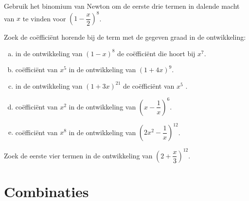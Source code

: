 \documentclass[12pt,twoside]{article}
\begin{document}
\begin{oefening}
Gebruik het binomium van Newton om de eerste drie termen in dalende macht van $x$ te vinden voor $\left(1-\dfrac{x}{2}\right)^8$.
\end{oefening}

\begin{oefening}
Zoek de coëfficiënt horende bij de term met de gegeven graad in de ontwikkeling:
\begin{enumerate}[(a)]
  \item in de ontwikkeling van $\left(1-x\right)^8$ de coëfficiënt die hoort bij $x^7$.
  \item coëfficiënt van $x^5$ in de ontwikkeling van $\left(1+4x\right)^9$.
  \item in de ontwikkeling van $\left(1+3x\right)^{21}$ de coëfficiënt van $x^5$ .
  \item coëfficiënt van $x^2$ in de ontwikkeling van $\left(x-\dfrac{1}{x}\right)^6$.
  \item coëfficiënt van $x^8$ in de ontwikkeling van $\left(2x^2-\dfrac{1}{x}\right)^{12}$.
\end{enumerate}
\end{oefening}

\begin{oefening}
Zoek de eerste vier termen in de ontwikkeling van $\left(2+\dfrac{x}{3}\right)^{12}$.
\end{oefening}

\pagebreak
\section{Combinaties}
\end{document}
